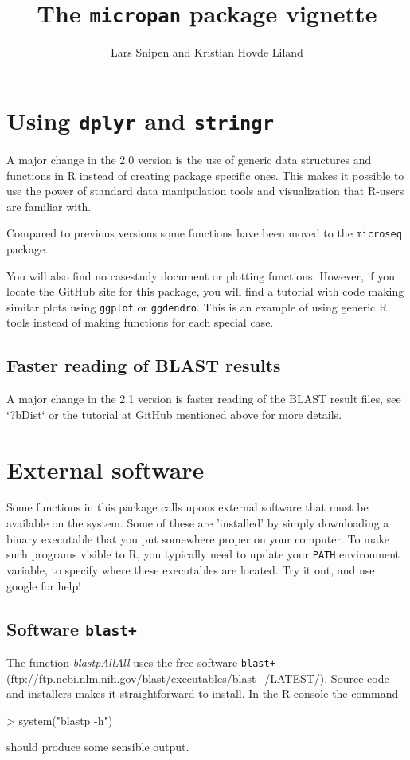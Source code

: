 \documentclass{article}
\title{The \texttt{micropan} package vignette}
\author{Lars Snipen and Kristian Hovde Liland}
\date{}
\begin{document}


\maketitle


\section{Using \texttt{dplyr} and \texttt{stringr}}
A major change in the 2.0 version is the use of generic data structures and functions in R instead of creating package specific ones. This makes it possible to use the power of standard data manipulation tools and visualization that R-users are familiar with.

Compared to previous versions some functions have been moved to the \texttt{microseq} package.

You will also find no casestudy document or plotting functions. However, if you locate the GitHub site for this package, you will find a tutorial with code making similar plots using \texttt{ggplot} or \texttt{ggdendro}. This is an example of using generic R tools instead of making functions for each special case.

\subsection{Faster reading of BLAST results}
A major change in the 2.1 version is faster reading of the BLAST result files, see `?bDist` or the tutorial at GitHub mentioned above for more details. 


\section{External software}
Some functions in this package calls upons external software that must be available on the system. Some of these are 'installed' by simply downloading a binary executable that you put somewhere proper on your computer. To make such programs visible to R, you typically need to update your \texttt{PATH} environment variable, to specify where these executables are located. Try it out, and use google for help!


\subsection{Software \texttt{blast+}}
The function \emph{blastpAllAll} uses the free software \texttt{blast+} (ftp://ftp.ncbi.nlm.nih.gov/blast/executables/blast+/LATEST/). Source code and installers makes it straightforward to install. In the R console the command
\begin{Schunk}
\begin{Sinput}
> system("blastp -h")
\end{Sinput}
\end{Schunk}
should produce some sensible output.
\end{document}
